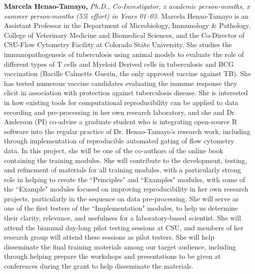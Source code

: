 \documentclass[pdftex,english,11pt,parskip=half]{scrartcl}
\begin{document}
\noindent \textbf{Marcela Henao-Tamayo,} \textit{Ph.D., Co-Investigator, x academic person-months, x summer person-months (5\% effort) in Years 01--03.} Marcela Henao-Tamayo is an Assistant Professor in the Department of Microbiology, Immunology \& Pathology, College of Veterinary Medicine and Biomedical Sciences, and the Co-Director of CSU-Flow Cytometry Facility at Colorado State University. She studies the immunopathogenesis of tuberculosis using animal models to evaluate the role of different types of T cells and Myeloid Derived cells in tuberculosis and BCG vaccination (Bacille Calmette Guerin, the only approved vaccine against TB). She has tested numerous vaccine candidates evaluating the immune response they elicit in association with protection against tuberculosis disease. She is interested in how existing tools for computational reproducibility can be applied to data recording and pre-processing in her own research laboratory, and she and Dr. Anderson (PI) co-advise a graduate student who is integrating open-source R software into the regular practice of Dr. Henao-Tamayo's research work, including through implementation of reproducible automated gating of flow cytometry data. In this project, she will be one of the co-authors of the online book containing the training modules. She will contribute to the development, testing, and refinement of materials for all training modules, with a particularly strong role in helping to create the ``Principles" and ``Examples" modules, with some of the ``Example" modules focused on improving reproducibility in her own research projects, particularly in the sequence on data pre-processing. She will serve as one of the first testers of the ``Implementation" modules, to help us determine their clarity, relevance, and usefulness for a laboratory-based scientist. She will attend the biannual day-long pilot testing sessions at CSU, and members of her research group will attend these sessions as pilot testers. She will help disseminate the final training materials among our target audience, including through helping prepare the workshops and presentations to be given at conferences during the grant to help disseminate the materials. 
\end{document}
